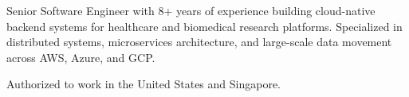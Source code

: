 

\begin{cvparagraph}

Senior Software Engineer with 8+ years of experience building cloud-native backend systems for
healthcare and biomedical research platforms. Specialized in distributed systems, microservices
architecture, and large-scale data movement across AWS, Azure, and GCP.

Authorized to work in the United States and Singapore.
\end{cvparagraph}
